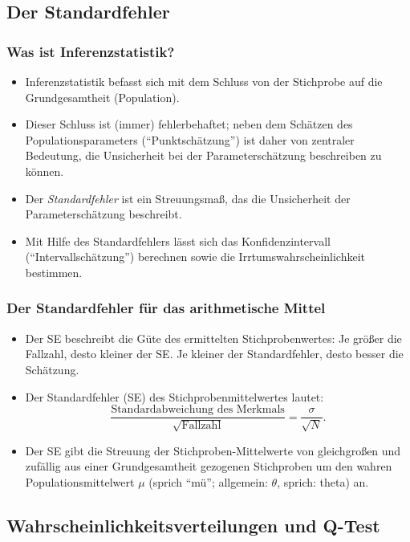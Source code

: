 \subsection{Der Standardfehler}\label{sec:der-standardfehler}

\begin{frame}
  \frametitle{Was ist Inferenzstatistik?}
  \begin{itemize}
  \item<+-> Inferenzstatistik befasst sich mit dem Schluss von der Stichprobe auf die Grundgesamtheit (Population).
  \item<+-> Dieser Schluss ist (immer) fehlerbehaftet; neben dem Schätzen des Populationsparameters ("`Punktschätzung"') ist daher von
    zentraler Bedeutung, die Unsicherheit bei der Parameterschätzung beschreiben zu können.
  \item<+-> Der \emph{Standardfehler} ist ein Streuungsmaß, das die Unsicherheit der Parameterschätzung beschreibt.
  \item<+-> Mit Hilfe des Standardfehlers lässt sich das Konfidenzintervall ("`Intervallschätzung"') berechnen sowie die
    Irrtumswahrscheinlichkeit bestimmen.
  \end{itemize}
\end{frame}


\begin{frame}
  \frametitle{Der Standardfehler für das arithmetische Mittel}
  \begin{itemize}
      \item Der SE beschreibt die Güte des ermittelten Stichprobenwertes: Je größer die Fallzahl, desto kleiner der
    SE. Je kleiner der Standardfehler, desto besser die Schätzung.
  \item Der Standardfehler (SE) des Stichprobenmittelwertes lautet:
    \begin{equation*}
      \frac{\text{Standardabweichung des Merkmals}}{\sqrt{\text{Fallzahl}}}=\frac{\sigma}{\sqrt{N}}.
    \end{equation*}
  \item Der SE gibt die Streuung der Stichproben-Mittelwerte von gleichgroßen und zufällig aus einer Grundgesamtheit gezogenen
    Stichproben um den wahren Populationsmittelwert $\mu$ (sprich "`mü"'; allgemein: $\theta$, sprich: theta) an.
  \end{itemize}
\end{frame}

\subsection{Wahrscheinlichkeitsverteilungen und Q-Test}


